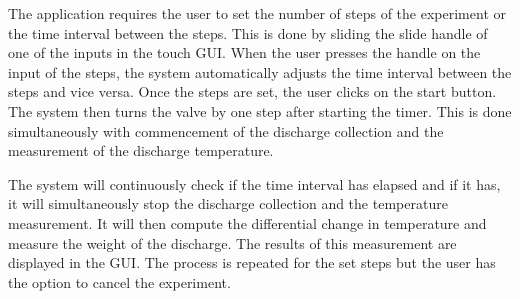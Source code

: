 The application requires the user to set the number of steps of the experiment or the time interval between the steps. This is done by sliding the slide handle of one of the inputs in the touch GUI. When the user presses the handle on the input of the steps, the system automatically adjusts the time interval between the steps and vice versa. Once the steps are set, the user clicks on the start button. The system then turns the valve by one step after starting the timer. This is done simultaneously with commencement of the discharge collection and the measurement of the discharge temperature.
\par
The system will continuously check if the time interval has elapsed and if it has, it will simultaneously stop the discharge collection and the temperature measurement.  It will then compute the differential change in temperature and measure the weight of the discharge. The results of this measurement are displayed in the GUI. The process is repeated for the set steps but the user has the option to cancel the experiment.


